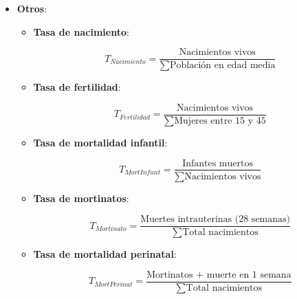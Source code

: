 \begin{itemize}[itemsep=0pt,parsep=0pt,topsep=0pt,partopsep=0pt]
\begin{itemize}[itemsep=0pt,parsep=0pt,topsep=0pt,partopsep=0pt]
\begin{center}
			\begin{equation}
			T_I = \dfrac{\mbox{Casos nuevos}}{\sum\mbox{Tiempos individuales}}
			\end{equation}
			[Prevalencia]{Prevalencia: se lee <<Hay X casos de cada $10^N$ de individuos enfermos>>.}
		\end{center}
	\end{itemize}
	\item\textbf{Otros}:
	\begin{itemize}[itemsep=0pt,parsep=0pt,topsep=0pt,partopsep=0pt]
		\item \textbf{Tasa de nacimiento}:
		\begin{center}
			\begin{equation}
				T_{Nacimiento} = \dfrac{\mbox{Nacimientos vivos}}{\sum\mbox{Población en edad media}}
			\end{equation}
		\end{center}
		\item\textbf{Tasa de fertilidad}:
		\begin{center}
			\begin{equation}
				T_{Fertilidad} = \dfrac{\mbox{Nacimientos vivos}}{\sum\mbox{Mujeres entre 15 y 45}}
			\end{equation}
		\end{center}
		\item\textbf{Tasa de mortalidad infantil}:
		\begin{center}
			\begin{equation}
				T_{Mort Infant} = \dfrac{\mbox{Infantes muertos}}{\sum\mbox{Nacimientos vivos}}
			\end{equation}
		\end{center}
		\item\textbf{Tasa de mortinatos}:
		\begin{center}
			\begin{equation}
				T_{Mortinato} = \dfrac{\mbox{Muertes intrauterinas (28 semanas)}}{\sum\mbox{Total nacimientos}}
			\end{equation}
		\end{center}
		\item\textbf{Tasa de mortalidad perinatal}:
		\begin{center}
			\begin{equation}
				T_{Mort Perinat} = \dfrac{\mbox{Mortinatos + muerte en 1 semana}}{\sum\mbox{Total nacimientos}}
			\end{equation}
		\end{center}
	\end{itemize}
\end{itemize}
